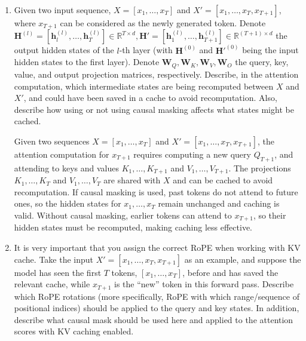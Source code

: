 \begin{enumerate}
\begin{enumerate}
    \item Given two input sequence, $X = [x_1, \dots, x_T]$ and $X' = [x_1,
    \dots, x_T, x_{T+1}]$, where $x_{T+1}$ can be considered as the newly
    generated token. Denote $\mathbf{H}^{(l)} = [\mathbf{h}_l^{(l)}, \dots,
    \mathbf{h}_T^{(l)}] \in \mathbb{R}^{T \times d}, \mathbf{H'} =
    [\mathbf{h}_1^{(l)}, \dots, \mathbf{h}_{T+1}^{(l)}] \in \mathbb{R}^{(T+1)
    \times d}$ the output hidden states of the $l$-th layer (with
    $\mathbf{H}^{(0)}$ and $\mathbf{H'}^{(0)}$ being the input hidden states to
    the first layer). Denote $\mathbf{W}_Q, \mathbf{W}_K, \mathbf{W}_V,
    \mathbf{W}_O$ the query, key, value, and output projection matrices,
    respectively. Describe, in the attention computation, which intermediate
    states are being recomputed between $X$ and $X'$, and could have been saved
    in a cache to avoid recomputation. Also, describe how using or not using
    causal masking affects what states might be cached.

    \begin{answerbox}[1.5in]

    Given two sequences $X = [x_1, \dots, x_T]$ and $X' = [x_1, \dots, x_T,
    x_{T+1}]$, the attention computation for $x_{T+1}$ requires computing a new
    query $Q_{T+1}$, and attending to keys and values $K_1, \dots, K_{T+1}$ and
    $V_1, \dots, V_{T+1}$. The projections $K_1, \dots, K_T$ and $V_1, \dots,
    V_T$ are shared with $X$ and can be cached to avoid recomputation. If causal
    masking is used, past tokens do not attend to future ones, so the hidden
    states for $x_1, \dots, x_T$ remain unchanged and caching is valid. Without
    causal masking, earlier tokens can attend to $x_{T+1}$, so their hidden
    states must be recomputed, making caching less effective.

    \end{answerbox}

    \item It is very important that you assign the correct RoPE when working
    with KV cache. Take the input $X' = [x_1, \dots, x_T, x_{T+1}]$ as an
    example, and suppose the model has seen the first $T$ tokens, $[x_1, \dots,
    x_T]$, before and has saved the relevant cache, while $x_{T+1}$ is the
    ``new'' token in this forward pass. Describe which RoPE rotations (more
    specifically, RoPE with which range/sequence of positional indices) should
    be applied to the query and key states. In addition, describe what causal
    mask should be used here and applied to the attention scores with KV caching
    enabled. 


\end{enumerate}
\end{enumerate}
